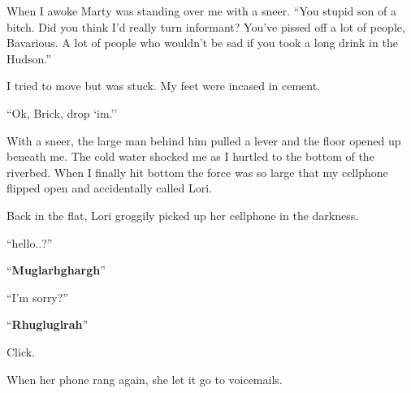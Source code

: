 When I awoke Marty was standing over me with a sneer. ``You
stupid son of a bitch. Did you think I'd really turn
informant? You've pissed off a lot of people, Bavarious. A
lot of people who wouldn't be sad if you took a long drink in
the Hudson.''



I tried to move but was stuck. My feet were incased in
cement.



``Ok, Brick, drop `im.''



With a sneer, the large man behind him pulled a lever and the floor
opened up beneath me. The cold water shocked me as I hurtled to the
bottom of the riverbed. When I finally hit bottom the force was so
large that my cellphone flipped open and accidentally called
Lori.



Back in the flat, Lori groggily picked up her cellphone in the
darkness.



``hello..?''



``{\bf Muglarhghargh}''



``I'm sorry?''



``{\bf Rhugluglrah}''



Click.



When her phone rang again, she let it go to voicemails. 

 




